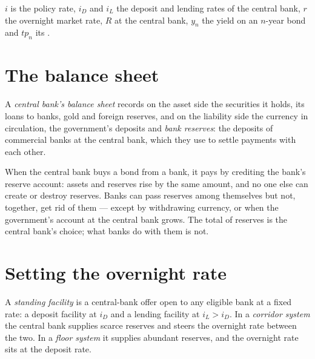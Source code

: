 \begin{notation}\label{not:b3:central-banking:symbols}
$i$ is the policy rate, $i_D$ and $i_L$ the deposit and lending rates of the central
bank, $r$ the overnight market rate, $R$  at the central bank, $y_n$ the
yield on an $n$-year bond and $\mathit{tp}_n$ its .
\end{notation}

\section{The balance sheet}\label{sec:b3:central-banking:balance-sheet}

\begin{definition}\label{def:b3:central-banking:balance-sheet}
A \emph{central bank's balance sheet} records on the asset side the securities it
holds, its loans to banks, gold and foreign reserves, and on the liability side the
currency in circulation, the government's deposits and \emph{bank reserves}: the
deposits of commercial banks at the central bank, which they use to settle
payments with each other.
\end{definition}

\begin{measure}
When the central bank buys a bond from a bank, it pays by crediting the bank's
reserve account: assets and reserves rise by the same amount, and no one else can
create or destroy reserves. Banks can pass reserves among themselves but not,
together, get rid of them --- except by withdrawing currency, or when the
government's account at the central bank grows. The total of reserves is the central
bank's choice; what banks do with them is not.
\end{measure}

\section{Setting the overnight rate}\label{sec:b3:central-banking:corridor}

\begin{definition}\label{def:b3:central-banking:corridor}
A \emph{standing facility} is a central-bank offer open to any eligible bank at a
fixed rate: a deposit facility at $i_D$ and a lending facility at $i_L > i_D$. In a
\emph{corridor system} the central bank supplies scarce reserves and steers the
overnight rate between the two. In a \emph{floor system} it supplies abundant
reserves, and the overnight rate sits at the deposit rate.
\end{definition}

